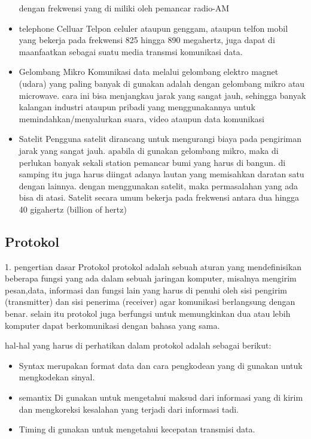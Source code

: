 \begin{itemize}
        dengan frekwensi yang di miliki oleh pemancar radio-AM
  \item telephone Celluar
        Telpon celuler ataupun genggam, ataupun telfon mobil yang bekerja pada frekwensi 825 hingga 890 megahertz, juga dapat di maanfaatkan sebagai suatu media transmsi komunikasi data.
  \item Gelombang Mikro
        Komunikasi data melalui gelombang elektro magnet (udara)
        yang paling banyak di gunakan adalah dengan gelombang mikro atau microwave. cara ini bisa menjangkau jarak yang sangat jauh, sehingga banyak kalangan industri ataupun pribadi yang menggunakannya untuk memindahkan/menyalurkan suara, video ataupun data komunikasi
  \item Satelit
        Pengguna satelit dirancang untuk mengurangi biaya pada pengiriman jarak yang sangat jauh. apabila di gunakan gelombang mikro, maka di perlukan banyak sekali station pemancar bumi yang harus di bangun. di samping itu juga
        harus diingat adanya lautan yang memisahkan daratan satu
        dengan lainnya. dengan menggunakan satelit, maka permasalahan yang ada bisa di atasi. Satelit secara umum
        bekerja pada frekwensi antara dua hingga 40 gigahertz
        (billion of hertz)
  \end{itemize}

\subsection{Protokol}
1. pengertian dasar Protokol
    protokol adalah sebuah aturan yang mendefinisikan beberapa fungsi yang ada dalam sebuah jaringan komputer, misalnya mengirim pesan,data, informasi dan fungsi lain yang harus di penuhi oleh sisi pengirim (transmitter) dan sisi penerima (receiver) agar komunikasi berlangsung dengan benar. selain itu protokol juga berfungsi untuk memungkinkan dua atau lebih komputer dapat berkomunikasi dengan bahasa yang sama.

hal-hal yang harus di perhatikan dalam protokol adalah sebagai berikut:
\begin{itemize}
  \item Syntax
        merupakan format data dan cara pengkodean yang di gunakan untuk mengkodekan sinyal.
  \item semantix
        Di gunakan untuk mengetahui maksud dari informasi yang di kirim dan mengkoreksi kesalahan yang terjadi dari informasi tadi.
  \item Timing
        di gunakan untuk mengetahui kecepatan transmisi data.
\end{itemize}

